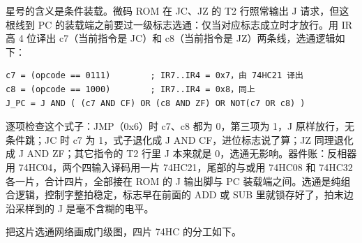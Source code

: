 星号的含义是条件装载。微码 ROM 在 JC、JZ 的 T2 行照常输出 J 请求，但这根线到 PC 的装载端之前要过一级标志选通：仅当对应标志成立时才放行。用 IR 高 4 位译出 c7（当前指令是 JC）和 c8（当前指令是 JZ）两条线，选通逻辑如下：

\begin{lstlisting}
c7 = (opcode == 0111)        ; IR7..IR4 = 0x7，由 74HC21 译出
c8 = (opcode == 1000)        ; IR7..IR4 = 0x8，同上
J_PC = J AND ( (c7 AND CF) OR (c8 AND ZF) OR NOT(c7 OR c8) )
\end{lstlisting}

逐项检查这个式子：JMP（0x6）时 c7、c8 都为 0，第三项为 1，J 原样放行，无条件跳；JC 时 c7 为 1，式子退化成 J AND CF，进位标志说了算；JZ 同理退化成 J AND ZF；其它指令的 T2 行里 J 本来就是 0，选通无影响。器件账：反相器用 74HC04，两个四输入译码用一片 74HC21，尾部的与或用 74HC08 和 74HC32 各一片，合计四片，全部接在 ROM 的 J 输出脚与 PC 装载端之间。选通是纯组合逻辑，控制字整拍稳定，标志早在前面的 ADD 或 SUB 里就锁存好了，拍末边沿采样到的 J 是毫不含糊的电平。

把这片选通网络画成门级图，四片 74HC 的分工如下。

